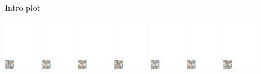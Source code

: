 \documentclass[review]{elsarticle}
\begin{document}
\begin{figure}
  \centering
  
  \caption{Intro plot}
\end{figure}

\begin{figure}
  \centering
  \hspace{0.055\textwidth}%
  \includegraphics[page=1,width=0.132\textwidth]{../data/visualization}%
  \hspace{0.002\textwidth}%
  \includegraphics[page=2,width=0.132\textwidth]{../data/visualization}%
  \hspace{0.002\textwidth}%
  \includegraphics[page=3,width=0.132\textwidth]{../data/visualization}%
  \hspace{0.002\textwidth}%
  \includegraphics[page=4,width=0.132\textwidth]{../data/visualization}%
  \hspace{0.002\textwidth}%
  \includegraphics[page=5,width=0.132\textwidth]{../data/visualization}%
  \hspace{0.002\textwidth}%
  \includegraphics[page=6,width=0.132\textwidth]{../data/visualization}%
  \hspace{0.002\textwidth}%
  \includegraphics[page=7,width=0.132\textwidth]{../data/visualization}%
  

\end{figure}
\end{document}
